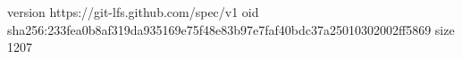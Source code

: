 version https://git-lfs.github.com/spec/v1
oid sha256:233fea0b8af319da935169e75f48e83b97e7faf40bdc37a25010302002ff5869
size 1207
